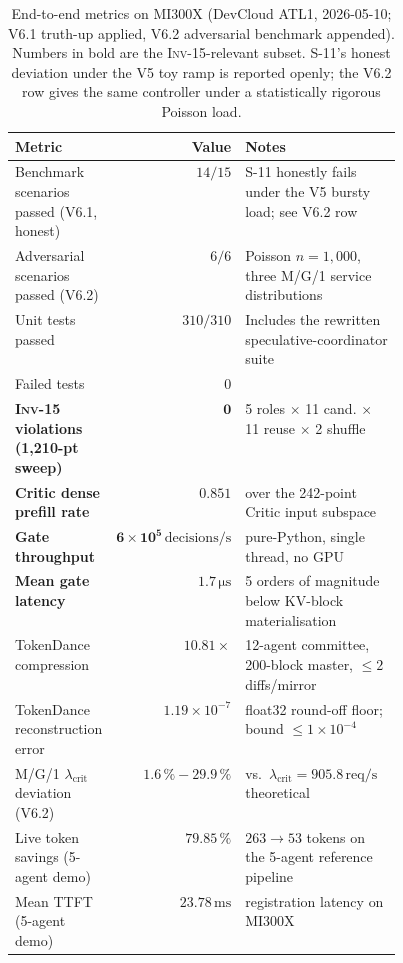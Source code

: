\documentclass[10pt,twocolumn]{article}
\newcommand{\INV}[1]{\textsc{Inv-#1}}
\begin{document}
\begin{table}[t]
  \centering
  \small
  \caption{End-to-end metrics on MI300X (DevCloud ATL1, 2026-05-10;
           V6.1 truth-up applied, V6.2 adversarial benchmark
           appended). Numbers in bold are the \INV{15}-relevant
           subset. S-11's honest deviation under the V5 toy ramp is
           reported openly; the V6.2 row gives the same controller
           under a statistically rigorous Poisson load.}
  \label{tab:e2e}
  \begin{tabular}{@{}lrp{0.45\linewidth}@{}}
    \toprule
    Metric & Value & Notes \\
    \midrule
    Benchmark scenarios passed (V6.1, honest)
        & $14 / 15$
        & S-11 honestly fails under the V5 bursty load; see V6.2 row \\
    Adversarial scenarios passed (V6.2)
        & $6 / 6$
        & Poisson $n{=}1{,}000$, three M/G/1 service distributions \\
    Unit tests passed
        & $310 / 310$
        & Includes the rewritten speculative-coordinator suite \\
    Failed tests
        & $0$
        & \\
    \midrule
    \textbf{\INV{15} violations (1{,}210-pt sweep)}
        & $\mathbf{0}$
        & 5 roles $\times$ 11 cand. $\times$ 11 reuse $\times$ 2 shuffle \\
    \textbf{Critic dense prefill rate}
        & $\mathbf{0.851}$
        & over the 242-point Critic input subspace \\
    \textbf{Gate throughput}
        & $\mathbf{6\!\times\!10^{5}\,\mathrm{decisions/s}}$
        & pure-Python, single thread, no GPU \\
    \textbf{Mean gate latency}
        & $\mathbf{1.7\,\mathrm{\mu s}}$
        & 5 orders of magnitude below KV-block materialisation \\
    \midrule
    TokenDance compression
        & $10.81\times$
        & 12-agent committee, 200-block master, $\leq 2$ diffs/mirror \\
    TokenDance reconstruction error
        & $1.19\times10^{-7}$
        & float32 round-off floor; bound $\leq 1\times10^{-4}$ \\
    M/G/1 $\lambda_{\text{crit}}$ deviation (V6.2)
        & $1.6\,\%\!-\!29.9\,\%$
        & vs.\ $\lambda_{\text{crit}}\!=\!905.8\,\mathrm{req/s}$ theoretical \\
    Live token savings (5-agent demo)
        & $79.85\,\%$
        & $263 \to 53$ tokens on the 5-agent reference pipeline \\
    Mean TTFT (5-agent demo)
        & $23.78\,\mathrm{ms}$
        & registration latency on MI300X \\
    \bottomrule
  \end{tabular}
\end{table}
\end{document}
